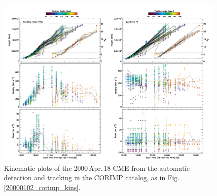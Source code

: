 \documentclass[referee,a4paper,12pt,traditabstract]{swsc}
\begin{document}
\begin{linenumbers}
\begin{figure}[t]
\centerline{\includegraphics[width=\linewidth]{images/20000418_corimp_kins.pdf}}
\caption{Kinematic plots of the 2000\,Apr.\,18 CME from the automatic detection and tracking in the CORIMP catalog, as in Fig.\,\ref{20000102_corimp_kins}.}
\label{20000418_corimp_kins}
\end{figure}


\end{linenumbers}
\end{document}
